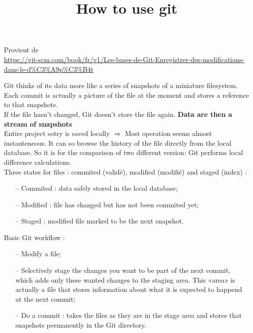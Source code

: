 \documentclass[a4paper,12pt]{article}
\title{How to use git}%
\date{}
\numberwithin{equation}{section} %
\begin{document}
\maketitle

\begin{center}
Provient de \\ \url{https://git-scm.com/book/fr/v1/Les-bases-de-Git-Enregistrer-des-modifications-dans-le-d%C3%A9p%C3%B4t} 
\end{center}

\vspace{4mm}
\flushleft
Git thinks of its data more like a series of snapshots of a miniature filesystem.\\
Each commit is actually a picture of the file at the moment and stores a reference to that snapshots.\\
If the file hasn't changed, Git doesn't store the file again. \textbf{Data are then a stream of snapshots}\\

Entire project sotry is saved locally $\Rightarrow$ Most operation seems almost instanteneous. It can so browse the history of the file directly from the local database. So it is for the comparison of two different version: Git performs local difference calculations.\\[3mm]

Three states for files : commited (validé), modified (modifié) and staged (index) :
	\begin{itemize}
		\item[--] Commited : data safely stored in the local database; \\
		\item[--] Modified : file has changed but has not been commited yet; \\
		\item[--] Staged   : modified file marked to be the next snapshot. \\[6mm]
	\end{itemize} 

Basic Git workflow :
	\begin{itemize}
		\item[--] Modify a file;\\
		\item[--] Selectively stage the changes you want to be part of the next commit, which adds only these wanted changes to the staging area. This «area» is actually a file that stores information about what it is expected to happend at the next commit;\\
		\item[--] Do a commit : takes the files as they are in the stage area and stores that snapshots permanently in the Git directory. \\[6mm]
	\end{itemize}
\end{document}
